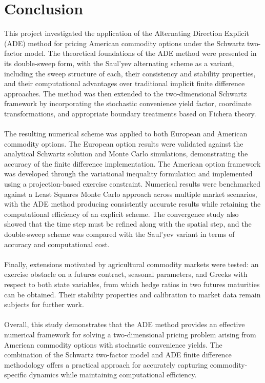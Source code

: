 \documentclass[12pt,a4paper]{article}
\begin{document}
\section{Conclusion}
This project investigated the application of the Alternating Direction Explicit (ADE) method for pricing American commodity options under the Schwartz two-factor model. The theoretical foundations of the ADE method were presented in its double-sweep form, with the Saul'yev alternating scheme as a variant, including the sweep structure of each, their consistency and stability properties, and their computational advantages over traditional implicit finite difference approaches. The method was then extended to the two-dimensional Schwartz framework by incorporating the stochastic convenience yield factor, coordinate transformations, and appropriate boundary treatments based on Fichera theory.\\\\
The resulting numerical scheme was applied to both European and American commodity options. The European option results were validated against the analytical Schwartz solution and Monte Carlo simulations, demonstrating the accuracy of the finite difference implementation. The American option framework was developed through the variational inequality formulation and implemented using a projection-based exercise constraint. Numerical results were benchmarked against a Least Squares Monte Carlo approach across multiple market scenarios, with the ADE method producing consistently accurate results while retaining the computational efficiency of an explicit scheme. The convergence study also showed that the time step must be refined along with the spatial step, and the double-sweep scheme was compared with the Saul'yev variant in terms of accuracy and computational cost.\\\\
Finally, extensions motivated by agricultural commodity markets were tested: an exercise obstacle on a futures contract, seasonal parameters, and Greeks with respect to both state variables, from which hedge ratios in two futures maturities can be obtained. Their stability properties and calibration to market data remain subjects for further work.\\\\
Overall, this study demonstrates that the ADE method provides an effective numerical framework for solving a two-dimensional pricing problem arising from American commodity options with stochastic convenience yields. The combination of the Schwartz two-factor model and ADE finite difference methodology offers a practical approach for accurately capturing commodity-specific dynamics while maintaining computational efficiency.
\end{document}
